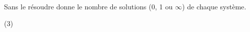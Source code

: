 %
%
    Sans le résoudre donne le nombre de solutions (0, 1 ou $\infty$) de chaque système.
    \begin{tasks}(3)
        \task {}
        \task {}
        \task {}
    \end{tasks}
